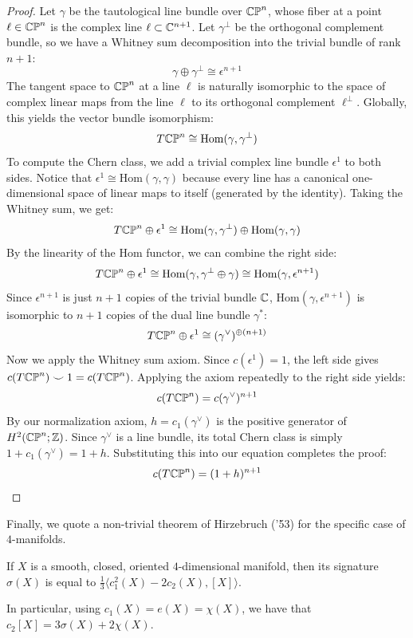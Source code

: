 \documentclass[12pt]{article}
\begin{document}
\begin{proof}
    Let $\gamma$ be the tautological line bundle over $\mathbb{CP}^n$, whose fiber at a point $\ell \in \mathbb{CP}^n$ is the complex line $\ell \subset \mathbb C^{n+1}$. Let $\gamma^\perp$ be the orthogonal complement bundle, so we have a Whitney sum decomposition into the trivial bundle of rank $n+1$:
    \[ \gamma \oplus \gamma^\perp \cong \epsilon^{n+1} \]
    The tangent space to $\mathbb{CP}^n$ at a line $\ell$ is naturally isomorphic to the space of complex linear maps from the line $\ell$ to its orthogonal complement $\ell^\perp$. Globally, this yields the vector bundle isomorphism:
    \[ T\mathbb{CP}^n \cong \text{Hom}(\gamma, \gamma^\perp) \]
    To compute the Chern class, we add a trivial complex line bundle $\epsilon^1$ to both sides. Notice that $\epsilon^1 \cong \text{Hom}(\gamma, \gamma)$ because every line has a canonical one-dimensional space of linear maps to itself (generated by the identity). Taking the Whitney sum, we get:
    \[ T\mathbb{CP}^n \oplus \epsilon^1 \cong \text{Hom}(\gamma, \gamma^\perp) \oplus \text{Hom}(\gamma, \gamma) \]
    By the linearity of the Hom functor, we can combine the right side:
    \[ T\mathbb{CP}^n \oplus \epsilon^1 \cong \text{Hom}(\gamma, \gamma^\perp \oplus \gamma) \cong \text{Hom}(\gamma, \epsilon^{n+1}) \]
    Since $\epsilon^{n+1}$ is just $n+1$ copies of the trivial bundle $\mathbb C$, $\text{Hom}(\gamma, \epsilon^{n+1})$ is isomorphic to $n+1$ copies of the dual line bundle $\gamma^*$:
    \[ T\mathbb{CP}^n \oplus \epsilon^1 \cong (\gamma^\vee)^{\oplus (n+1)} \]
    Now we apply the Whitney sum axiom. Since $c(\epsilon^1) = 1$, the left side gives $c(T\mathbb{CP}^n) \smile 1 = c(T\mathbb{CP}^n)$. Applying the axiom repeatedly to the right side yields:
    \[ c(T\mathbb{CP}^n) = c(\gamma^\vee)^{n+1} \]
    By our normalization axiom, $h = c_1(\gamma^\vee)$ is the positive generator of $H^2(\mathbb{CP}^n; \mathbb Z)$. Since $\gamma^\vee$ is a line bundle, its total Chern class is simply $1 + c_1(\gamma^\vee) = 1 + h$. Substituting this into our equation completes the proof:
    \[ c(T\mathbb{CP}^n) = (1+h)^{n+1} \]
\end{proof}

Finally, we quote a non-trivial theorem of Hirzebruch ('53) for the specific case of $4$-manifolds. 
\begin{theorem}
    If $X$ is a smooth, closed, oriented $4$-dimensional manifold, then its signature $\sigma(X)$ is equal to $\frac{1}{3}\langle c_1^2(X) - 2c_2(X), [X] \rangle$.
\end{theorem}
\begin{corollary}
    In particular, using $c_1(X) = e(X) = \chi(X)$, we have that $c_2[X] = 3\sigma(X) + 2\chi(X)$. 
\end{corollary}
\end{document}
